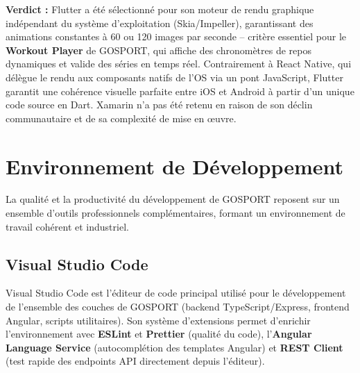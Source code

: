 \textbf{Verdict :} Flutter a été sélectionné pour son moteur de rendu graphique indépendant du système d'exploitation (Skia/Impeller), garantissant des animations constantes à 60 ou 120 images par seconde -- critère essentiel pour le \textbf{Workout Player} de GOSPORT, qui affiche des chronomètres de repos dynamiques et valide des séries en temps réel. Contrairement à React Native, qui délègue le rendu aux composants natifs de l'OS via un pont JavaScript, Flutter garantit une cohérence visuelle parfaite entre iOS et Android à partir d'un unique code source en Dart. Xamarin n'a pas été retenu en raison de son déclin communautaire et de sa complexité de mise en œuvre.

\section{Environnement de Développement}

La qualité et la productivité du développement de GOSPORT reposent sur un ensemble d'outils professionnels complémentaires, formant un environnement de travail cohérent et industriel.

\begin{table}[H]
\centering
\renewcommand{\arraystretch}{1.4}
\caption{Environnement de développement de GOSPORT}
\end{table}

\subsection{Visual Studio Code}
Visual Studio Code est l'éditeur de code principal utilisé pour le développement de l'ensemble des couches de GOSPORT (backend TypeScript/Express, frontend Angular, scripts utilitaires). Son système d'extensions permet d'enrichir l'environnement avec \textbf{ESLint} et \textbf{Prettier} (qualité du code), l'\textbf{Angular Language Service} (autocomplétion des templates Angular) et \textbf{REST Client} (test rapide des endpoints API directement depuis l'éditeur).

